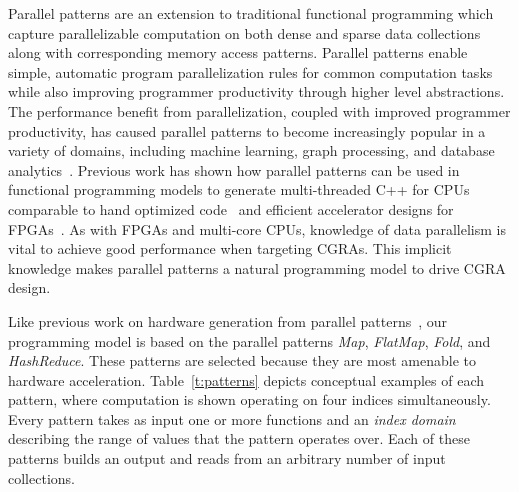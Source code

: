 



Parallel patterns are an extension to traditional functional programming which capture parallelizable computation on both dense and sparse data collections along with corresponding memory access patterns.
Parallel patterns enable simple, automatic program parallelization rules for common computation tasks
while also improving programmer productivity through higher level abstractions.
The performance benefit from parallelization, coupled with improved programmer productivity, has caused parallel patterns to become increasingly popular in a variety of domains,
including machine learning, graph processing, and database analytics~\cite{ecoop13sujeeth,pldi13halide}.
Previous work has shown how parallel patterns can be used in functional programming models to generate multi-threaded
C++ for CPUs comparable to hand optimized code~\cite{delite-tecs14} and efficient accelerator designs for FPGAs~\cite{auerbach10lime,george14fpl,delite2maxj}.
As with FPGAs and multi-core CPUs, knowledge of data parallelism is vital to achieve good performance when targeting CGRAs.
This implicit knowledge makes parallel patterns a natural programming model to drive CGRA design.

Like previous work on hardware generation from parallel patterns~\cite{george14fpl,delite2maxj}, our programming model is based on 
the parallel patterns \emph{Map}, \emph{FlatMap}, \emph{Fold}, and \emph{HashReduce}. These patterns are selected because they are most amenable to hardware acceleration.
Table~\ref{t:patterns} depicts conceptual examples of each pattern, where computation is shown operating on four indices simultaneously.
Every pattern takes as input one or more functions and an \emph{index domain} describing the range of values that the pattern operates over.
Each of these patterns builds an output and reads from an arbitrary number of input collections.


